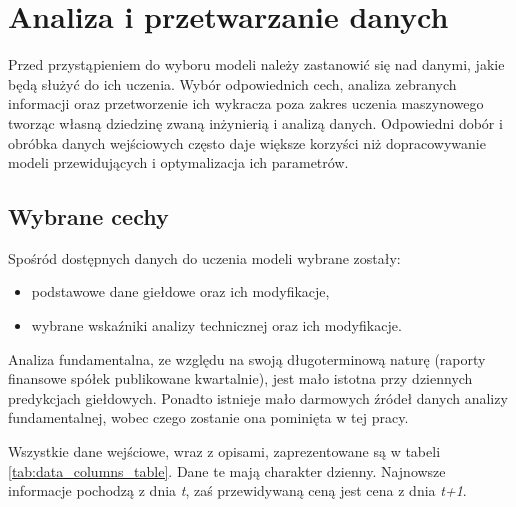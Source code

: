 \documentclass[a4paper, twoside, 11pt, openright]{article}
\begin{document}
\newpage

\section{Analiza i przetwarzanie danych}

Przed przystąpieniem do wyboru modeli należy zastanowić się nad danymi, jakie będą służyć do ich uczenia. Wybór odpowiednich cech, analiza zebranych informacji oraz przetworzenie ich wykracza poza zakres uczenia maszynowego tworząc własną dziedzinę zwaną inżynierią i analizą danych. Odpowiedni dobór i obróbka danych wejściowych często daje większe korzyści niż dopracowywanie modeli przewidujących i optymalizacja ich parametrów. 

\subsection{Wybrane cechy}

Spośród dostępnych danych do uczenia modeli wybrane zostały: 
\begin{itemize}
\item podstawowe dane giełdowe oraz ich modyfikacje,
\item wybrane wskaźniki analizy technicznej oraz ich modyfikacje.
\end{itemize}

Analiza fundamentalna, ze względu na swoją długoterminową naturę (raporty finansowe spółek publikowane kwartalnie), jest mało istotna przy dziennych predykcjach giełdowych. Ponadto istnieje mało darmowych źródeł danych analizy fundamentalnej, wobec czego zostanie ona pominięta w tej pracy.

\bigskip

Wszystkie dane wejściowe, wraz z opisami, zaprezentowane są w tabeli \ref{tab:data_columns_table}. Dane te mają charakter dzienny. Najnowsze informacje pochodzą z dnia \textit{t}, zaś przewidywaną ceną jest cena z dnia \textit{t+1}.
\end{document}
